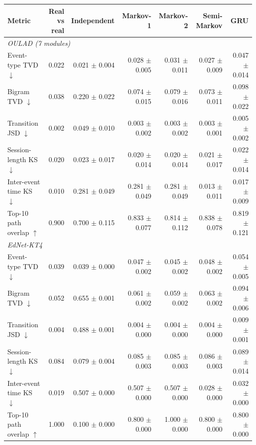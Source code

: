 \begin{tabular}{l r r r r r r }
\toprule
Metric & Real vs real & Independent & Markov-1 & Markov-2 & Semi-Markov & GRU \\
\midrule
\multicolumn{7}{l}{\textit{OULAD (7 modules)}} \\
Event-type TVD $\downarrow$ & 0.022 & 0.021 $\pm$ 0.004 & 0.028 $\pm$ 0.005 & 0.031 $\pm$ 0.011 & 0.027 $\pm$ 0.009 & 0.047 $\pm$ 0.014 \\
Bigram TVD $\downarrow$ & 0.038 & 0.220 $\pm$ 0.022 & 0.074 $\pm$ 0.015 & 0.079 $\pm$ 0.016 & 0.073 $\pm$ 0.011 & 0.098 $\pm$ 0.022 \\
Transition JSD $\downarrow$ & 0.002 & 0.049 $\pm$ 0.010 & 0.003 $\pm$ 0.002 & 0.003 $\pm$ 0.002 & 0.003 $\pm$ 0.001 & 0.005 $\pm$ 0.002 \\
Session-length KS $\downarrow$ & 0.020 & 0.023 $\pm$ 0.017 & 0.020 $\pm$ 0.014 & 0.020 $\pm$ 0.014 & 0.021 $\pm$ 0.017 & 0.022 $\pm$ 0.014 \\
Inter-event time KS $\downarrow$ & 0.010 & 0.281 $\pm$ 0.049 & 0.281 $\pm$ 0.049 & 0.281 $\pm$ 0.049 & 0.013 $\pm$ 0.011 & 0.017 $\pm$ 0.009 \\
Top-10 path overlap $\uparrow$ & 0.900 & 0.700 $\pm$ 0.115 & 0.833 $\pm$ 0.077 & 0.814 $\pm$ 0.112 & 0.838 $\pm$ 0.078 & 0.819 $\pm$ 0.121 \\
\midrule
\multicolumn{7}{l}{\textit{EdNet-KT4}} \\
Event-type TVD $\downarrow$ & 0.039 & 0.039 $\pm$ 0.000 & 0.047 $\pm$ 0.002 & 0.045 $\pm$ 0.002 & 0.048 $\pm$ 0.002 & 0.054 $\pm$ 0.005 \\
Bigram TVD $\downarrow$ & 0.052 & 0.655 $\pm$ 0.001 & 0.061 $\pm$ 0.002 & 0.059 $\pm$ 0.002 & 0.063 $\pm$ 0.002 & 0.094 $\pm$ 0.006 \\
Transition JSD $\downarrow$ & 0.004 & 0.488 $\pm$ 0.001 & 0.004 $\pm$ 0.000 & 0.004 $\pm$ 0.000 & 0.004 $\pm$ 0.000 & 0.009 $\pm$ 0.001 \\
Session-length KS $\downarrow$ & 0.084 & 0.079 $\pm$ 0.004 & 0.085 $\pm$ 0.003 & 0.085 $\pm$ 0.003 & 0.086 $\pm$ 0.003 & 0.089 $\pm$ 0.014 \\
Inter-event time KS $\downarrow$ & 0.019 & 0.507 $\pm$ 0.000 & 0.507 $\pm$ 0.000 & 0.507 $\pm$ 0.000 & 0.028 $\pm$ 0.000 & 0.032 $\pm$ 0.000 \\
Top-10 path overlap $\uparrow$ & 1.000 & 0.100 $\pm$ 0.000 & 0.800 $\pm$ 0.000 & 1.000 $\pm$ 0.000 & 0.800 $\pm$ 0.000 & 0.800 $\pm$ 0.000 \\
\bottomrule
\end{tabular}
